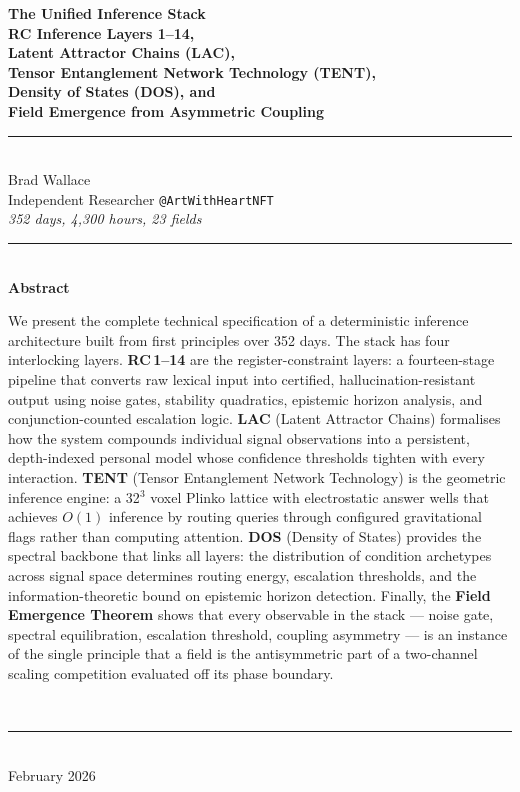 \documentclass[11pt,twoside]{article}
\theoremstyle{plain}
\theoremstyle{definition}
\theoremstyle{remark}
\begin{document}
\begin{titlepage}
\begin{center}
\vspace*{2cm}
{\Huge\bfseries\color{rcblue}
The Unified Inference Stack\\[0.4em]}
{\Large\bfseries\color{darkgray}
RC Inference Layers 1--14,\\
Latent Attractor Chains (LAC),\\
Tensor Entanglement Network Technology (TENT),\\
Density of States (DOS), and\\
Field Emergence from Asymmetric Coupling}\\[2em]
\rule{0.7\linewidth}{0.8pt}\\[1.5em]
{\large Brad Wallace}\\[0.4em]
{\normalsize Independent Researcher \quad\texttt{@ArtWithHeartNFT}}\\[0.5em]
{\normalsize\textit{352 days, 4{,}300 hours, 23 fields}}\\[2em]
\rule{0.7\linewidth}{0.4pt}\\[1.5em]
{\large\bfseries Abstract}\\[0.8em]
\begin{minipage}{0.85\textwidth}
\normalsize\setlength{\parskip}{0.4em}
We present the complete technical specification of a deterministic inference
architecture built from first principles over 352 days.  The stack has four
interlocking layers.
\textbf{RC\,1--14} are the register-constraint layers: a fourteen-stage pipeline
that converts raw lexical input into certified, hallucination-resistant output
using noise gates, stability quadratics, epistemic horizon analysis, and
conjunction-counted escalation logic.
\textbf{LAC} (Latent Attractor Chains) formalises how the system compounds
individual signal observations into a persistent, depth-indexed personal model
whose confidence thresholds tighten with every interaction.
\textbf{TENT} (Tensor Entanglement Network Technology) is the geometric
inference engine: a 32$^3$ voxel Plinko lattice with electrostatic answer
wells that achieves $O(1)$ inference by routing queries through configured
gravitational flags rather than computing attention.
\textbf{DOS} (Density of States) provides the spectral backbone that links all
layers: the distribution of condition archetypes across signal space determines
routing energy, escalation thresholds, and the information-theoretic bound on
epistemic horizon detection.  Finally, the \textbf{Field Emergence Theorem}
shows that every observable in the stack --- noise gate, spectral equilibration,
escalation threshold, coupling asymmetry --- is an instance of the single
principle that a field is the antisymmetric part of a two-channel scaling
competition evaluated off its phase boundary.
\end{minipage}\\[2em]
\rule{0.7\linewidth}{0.4pt}\\[1em]
{\small February 2026}
\end{center}
\end{titlepage}
\end{document}
